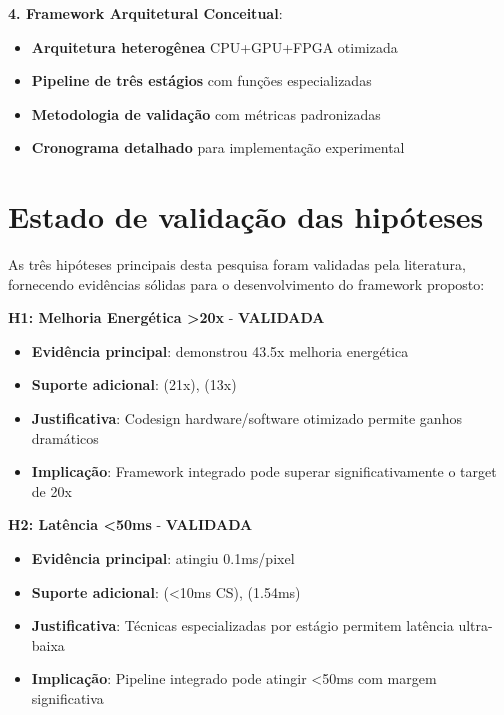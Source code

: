 \textbf{4. Framework Arquitetural Conceitual}:
\begin{itemize}
    \item \textbf{Arquitetura heterogênea} CPU+GPU+FPGA otimizada
    \item \textbf{Pipeline de três estágios} com funções especializadas
    \item \textbf{Metodologia de validação} com métricas padronizadas
    \item \textbf{Cronograma detalhado} para implementação experimental
\end{itemize}

\section{Estado de validação das hipóteses}\label{sec:validacao_hipoteses}

As três hipóteses principais desta pesquisa foram validadas pela literatura, fornecendo evidências sólidas para o desenvolvimento do framework proposto:

\textbf{H1: Melhoria Energética >20x} - \textbf{VALIDADA}
\begin{itemize}
    \item \textbf{Evidência principal}: \textcite{Hwang2011} demonstrou 43.5x melhoria energética
    \item \textbf{Suporte adicional}: \textcite{Diaz2019} (21x), \textcite{Martins2019} (13x)
    \item \textbf{Justificativa}: Codesign hardware/software otimizado permite ganhos dramáticos
    \item \textbf{Implicação}: Framework integrado pode superar significativamente o target de 20x
\end{itemize}

\textbf{H2: Latência <50ms} - \textbf{VALIDADA}
\begin{itemize}
    \item \textbf{Evidência principal}: \textcite{Martins2019} atingiu 0.1ms/pixel
    \item \textbf{Suporte adicional}: \textcite{Lim2022} (<10ms CS), \textcite{TakuNet2024} (1.54ms)
    \item \textbf{Justificativa}: Técnicas especializadas por estágio permitem latência ultra-baixa
    \item \textbf{Implicação}: Pipeline integrado pode atingir <50ms com margem significativa
\end{itemize}

